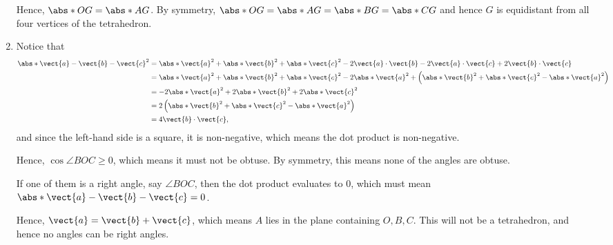 \begin{enumerate}
          Hence, \(\abs*{OG} = \abs*{AG}\). By symmetry, \(\abs*{OG} = \abs*{AG} = \abs*{BG} = \abs*{CG}\) and hence \(G\) is equidistant from all four vertices of the tetrahedron.

    \item Notice that
          \begin{align*}
              \abs*{\vect{a} - \vect{b} - \vect{c}}^2 & = \abs*{\vect{a}}^2 + \abs*{\vect{b}}^2 + \abs*{\vect{c}}^2 - 2 \vect{a} \cdot \vect{b} - 2 \vect{a} \cdot \vect{c} + 2 \vect{b} \cdot \vect{c}            \\
                                                      & = \abs*{\vect{a}}^2 + \abs*{\vect{b}}^2 + \abs*{\vect{c}}^2 - 2 \abs*{\vect{a}}^2 + \left(\abs*{\vect{b}}^2 + \abs*{\vect{c}}^2 - \abs*{\vect{a}}^2\right) \\
                                                      & = -2 \abs*{\vect{a}}^2 + 2 \abs*{\vect{b}}^2 + 2 \abs*{\vect{c}}^2                                                                                         \\
                                                      & = 2 \left(\abs*{\vect{b}}^2 + \abs*{\vect{c}}^2 - \abs*{\vect{a}}^2\right)                                                                                 \\
                                                      & = 4 \vect{b} \cdot \vect{c},
          \end{align*}
          and since the left-hand side is a square, it is non-negative, which means the dot product is non-negative.

          Hence, \(\cos \angle BOC \geq 0\), which means it must not be obtuse. By symmetry, this means none of the angles are obtuse.

          If one of them is a right angle, say \(\angle BOC\), then the dot product evaluates to \(0\), which must mean \(\abs*{\vect{a} - \vect{b} - \vect{c}} = 0\).

          Hence, \(\vect{a} = \vect{b} + \vect{c}\), which means \(A\) lies in the plane containing \(O, B, C\). This will not be a tetrahedron, and hence no angles can be right angles.
\end{enumerate}